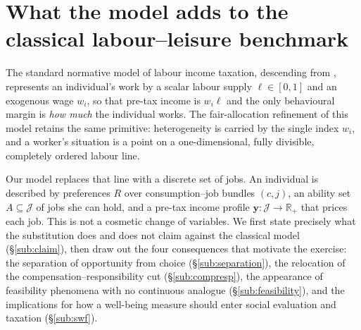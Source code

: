 %

\section{What the model adds to the classical labour--leisure benchmark}
\label{sec:contribution}

The standard normative model of labour income taxation, descending from
\textcite{mirrlees1971}, represents an individual's work by a scalar labour
supply $\ell\in[0,1]$ and an exogenous wage $w_i$, so that pre-tax income is
$w_i\ell$ and the only behavioural margin is \emph{how much} the individual
works. The fair-allocation refinement of this model
\textcite{FleurbaeyManiquet2006,FleurbaeyManiquet2007,fleurbaey_maniquet_2018}
retains the same primitive: heterogeneity is carried by the single index
$w_i$, and a worker's situation is a point on a one-dimensional, fully
divisible, completely ordered labour line.

Our model replaces that line with a discrete set of jobs. An individual is
described by preferences $R$ over consumption--job bundles $(c,j)$, an
ability set $A\subseteq\mathcal J$ of jobs she can hold, and a pre-tax income
profile $\mathbf y:\mathcal J\to\mathbb R_+$ that prices each job. This is not
a cosmetic change of variables. We first state precisely what the
substitution does and does not claim against the classical model
(\S\ref{sub:claim}), then draw out the four consequences that motivate the
exercise: the separation of opportunity from choice
(\S\ref{sub:separation}), the relocation of the compensation--responsibility
cut (\S\ref{sub:compresp}), the appearance of feasibility phenomena with no
continuous analogue (\S\ref{sub:feasibility}), and the implications for how a
well-being measure should enter social evaluation and taxation
(\S\ref{sub:swf}).

